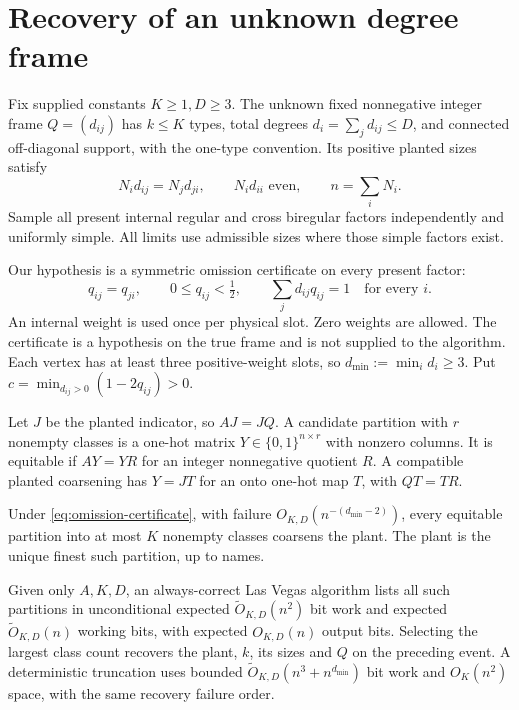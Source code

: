 \section{Recovery of an unknown degree frame}\label{sec:unknown-frame}
Fix supplied constants $K\ge1,D\ge3$. The unknown fixed nonnegative
integer frame $Q=(d_{ij})$ has $k\le K$ types, total degrees
$d_i=\sum_jd_{ij}\le D$, and connected off-diagonal support, with the
one-type convention. Its positive planted sizes satisfy
\begin{equation}\label{eq:unknown-balance}
 N_id_{ij}=N_jd_{ji},\qquad N_id_{ii}\text{ even},\qquad n=\sum_iN_i.
\end{equation}
Sample all present internal regular and cross biregular factors
independently and uniformly simple. All limits use admissible sizes
where those simple factors exist.

Our hypothesis is a symmetric omission certificate on every present
factor:
\begin{equation}\label{eq:omission-certificate}
 q_{ij}=q_{ji},\qquad 0\le q_{ij}<\tfrac12,\qquad
 \sum_jd_{ij}q_{ij}=1\quad\text{for every }i.
\end{equation}
An internal weight is used once per physical slot. Zero weights are
allowed. The certificate is a hypothesis on the true frame and is
not supplied to the algorithm. Each vertex has at least three
positive-weight slots, so $d_{\min}:=\min_i d_i\ge3$.
Put $c=\min_{d_{ij}>0}(1-2q_{ij})>0$.

Let $J$ be the planted indicator, so $AJ=JQ$. A candidate partition
with $r$ nonempty classes is a one-hot matrix
$Y\in\{0,1\}^{n\times r}$ with nonzero columns. It is equitable if
$AY=YR$ for an integer nonnegative quotient $R$.
A compatible planted coarsening has $Y=JT$ for an onto one-hot map
$T$, with $QT=TR$.

\begin{theorem}\label{thm:unknown-frame}
Under \eqref{eq:omission-certificate}, with failure
$O_{K,D}(n^{-(d_{\min}-2)})$, every equitable partition into at most
$K$ nonempty classes coarsens the plant. The plant is the unique
finest such partition, up to names.

Given only $A,K,D$, an always-correct Las Vegas algorithm lists all
such partitions in unconditional expected $\widetilde O_{K,D}(n^2)$
bit work and expected $\widetilde O_{K,D}(n)$ working bits, with
expected $O_{K,D}(n)$ output bits. Selecting the largest class count
recovers the plant, $k$, its sizes and $Q$ on the preceding event.
A deterministic truncation uses bounded
$\widetilde O_{K,D}(n^3+n^{d_{\min}})$ bit work and $O_K(n^2)$ space,
with the same recovery failure order.
\end{theorem}


